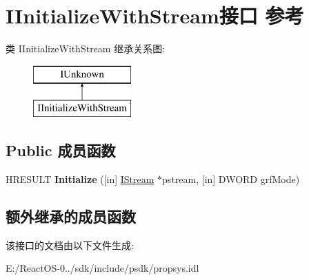 \hypertarget{interface_i_initialize_with_stream}{}\section{I\+Initialize\+With\+Stream接口 参考}
\label{interface_i_initialize_with_stream}
类 I\+Initialize\+With\+Stream 继承关系图\+:\begin{figure}[H]
\begin{center}
\leavevmode
\includegraphics[height=2.000000cm]{interface_i_initialize_with_stream}
\end{center}
\end{figure}
\subsection*{Public 成员函数}
\begin{DoxyCompactItemize}
\item 
\mbox{\label{interface_i_initialize_with_stream_a93289de07efe6a51ceecf171d2feeca7}} 
H\+R\+E\+S\+U\+LT {\bfseries Initialize} (\mbox{[}in\mbox{]} \hyperlink{interface_i_stream}{I\+Stream} $\ast$pstream, \mbox{[}in\mbox{]} D\+W\+O\+RD grf\+Mode)
\end{DoxyCompactItemize}
\subsection*{额外继承的成员函数}


该接口的文档由以下文件生成\+:\begin{DoxyCompactItemize}
\item 
E\+:/\+React\+O\+S-\/0../sdk/include/psdk/propsys.\+idl\end{DoxyCompactItemize}

